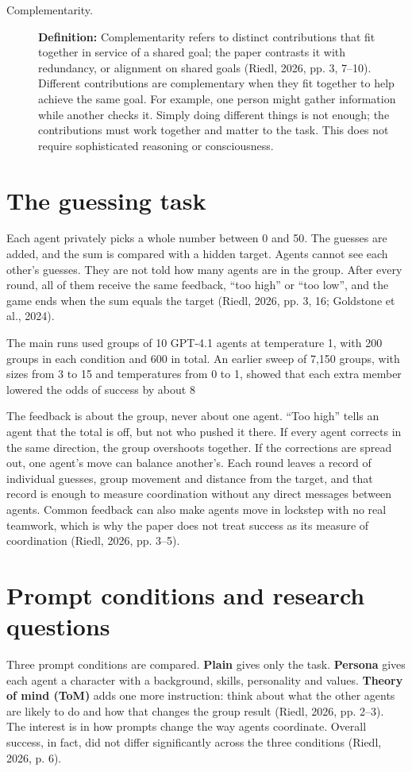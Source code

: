 \documentclass[12pt,a4paper,oneside]{report}
\begin{document}
\begin{description}
\item[Complementarity.]
\textbf{Definition:} Complementarity refers to distinct contributions that fit together in service of a shared goal; the paper contrasts it with redundancy, or alignment on shared goals (Riedl, 2026, pp. 3, 7–10).
Different contributions are complementary when they fit together to help achieve the same goal. For example, one person might gather information while another checks it. Simply doing different things is not enough; the contributions must work together and matter to the task. This does not require sophisticated reasoning or consciousness.
\end{description}

\section{The guessing task}
Each agent privately picks a whole number between 0 and 50. The guesses are added, and the sum is compared with a hidden target. Agents cannot see each other’s guesses. They are not told how many agents are in the group. After every round, all of them receive the same feedback, “too high” or “too low”, and the game ends when the sum equals the target (Riedl, 2026, pp. 3, 16; Goldstone et al., 2024).

The main runs used groups of 10 GPT-4.1 agents at temperature 1, with 200 groups in each condition and 600 in total. An earlier sweep of 7,150 groups, with sizes from 3 to 15 and temperatures from 0 to 1, showed that each extra member lowered the odds of success by about 8%

The feedback is about the group, never about one agent. “Too high” tells an agent that the total is off, but not who pushed it there. If every agent corrects in the same direction, the group overshoots together. If the corrections are spread out, one agent’s move can balance another’s. Each round leaves a record of individual guesses, group movement and distance from the target, and that record is enough to measure coordination without any direct messages between agents. Common feedback can also make agents move in lockstep with no real teamwork, which is why the paper does not treat success as its measure of coordination (Riedl, 2026, pp. 3–5).

\section{Prompt conditions and research questions}
Three prompt conditions are compared. \textbf{Plain} gives only the task. \textbf{Persona} gives each agent a character with a background, skills, personality and values. \textbf{Theory of mind (ToM)} adds one more instruction: think about what the other agents are likely to do and how that changes the group result (Riedl, 2026, pp. 2–3). The interest is in how prompts change the way agents coordinate. Overall success, in fact, did not differ significantly across the three conditions (Riedl, 2026, p. 6).
\end{document}
